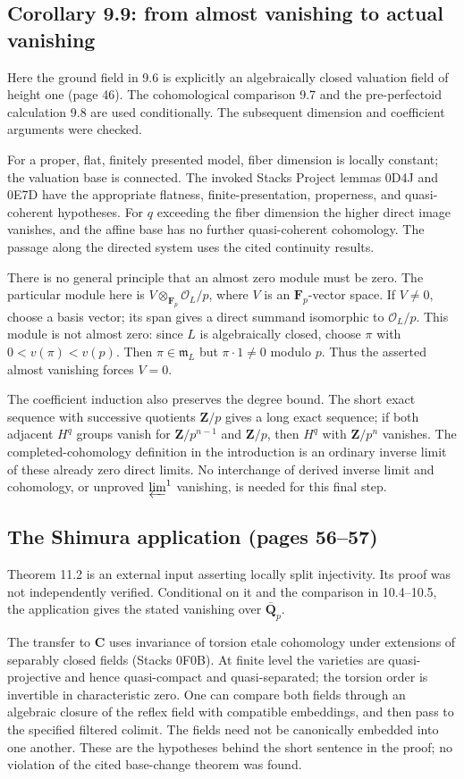 \documentclass[10pt]{article}
\begin{document}
\subsection*{Corollary 9.9: from almost vanishing to actual vanishing}
Here the ground field in 9.6 is explicitly an algebraically closed valuation field of height one (page 46). The cohomological comparison 9.7 and the pre-perfectoid calculation 9.8 are used conditionally. The subsequent dimension and coefficient arguments were checked.\par
For a proper, flat, finitely presented model, fiber dimension is locally constant; the valuation base is connected. The invoked Stacks Project lemmas 0D4J and 0E7D have the appropriate flatness, finite-presentation, properness, and quasi-coherent hypotheses. For \(q\) exceeding the fiber dimension the higher direct image vanishes, and the affine base has no further quasi-coherent cohomology. The passage along the directed system uses the cited continuity results.\par
There is no general principle that an almost zero module must be zero. The particular module here is \(V\otimes_{\mathbf F_p}\mathcal O_L/p\), where \(V\) is an \(\mathbf F_p\)-vector space. If \(V\ne0\), choose a basis vector; its span gives a direct summand isomorphic to \(\mathcal O_L/p\). This module is not almost zero: since \(L\) is algebraically closed, choose \(\pi\) with \(0<v(\pi)<v(p)\). Then \(\pi\in\mathfrak m_L\) but \(\pi\cdot1\ne0\) modulo \(p\). Thus the asserted almost vanishing forces \(V=0\).\par
The coefficient induction also preserves the degree bound. The short exact sequence with successive quotients \(\mathbf Z/p\) gives a long exact sequence; if both adjacent \(H^q\) groups vanish for \(\mathbf Z/p^{n-1}\) and \(\mathbf Z/p\), then \(H^q\) with \(\mathbf Z/p^n\) vanishes. The completed-cohomology definition in the introduction is an ordinary inverse limit of these already zero direct limits. No interchange of derived inverse limit and cohomology, or unproved \(\varprojlim^1\) vanishing, is needed for this final step.\par
\subsection*{The Shimura application (pages 56–57)}
Theorem 11.2 is an external input asserting locally split injectivity. Its proof was not independently verified. Conditional on it and the comparison in 10.4–10.5, the application gives the stated vanishing over \(\overline{\mathbf Q}_p\).\par
The transfer to \(\mathbf C\) uses invariance of torsion etale cohomology under extensions of separably closed fields (Stacks 0F0B). At finite level the varieties are quasi-projective and hence quasi-compact and quasi-separated; the torsion order is invertible in characteristic zero. One can compare both fields through an algebraic closure of the reflex field with compatible embeddings, and then pass to the specified filtered colimit. The fields need not be canonically embedded into one another. These are the hypotheses behind the short sentence in the proof; no violation of the cited base-change theorem was found.\par
\end{document}
